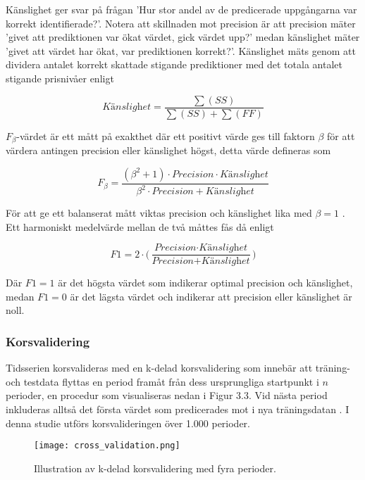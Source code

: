 \documentclass[11pt]{article}
\numberwithin{equation}{section}
\numberwithin{table}{section}
\numberwithin{figure}{section}
\begin{document}
Känslighet ger svar på frågan 'Hur stor andel av de predicerade uppgångarna var korrekt identifierade?'. Notera att skillnaden mot precision är att precision mäter 'givet att prediktionen var ökat värdet, gick värdet upp?' medan känslighet mäter 'givet att värdet har ökat, var prediktionen korrekt?'. Känslighet mäts genom att dividera antalet korrekt skattade stigande prediktioner med det totala antalet stigande prisnivåer enligt

\begin{equation}
    \textit{Känslighet} = \frac{\sum(SS)}{\sum(SS)+\sum(FF)}
\end{equation}

$F_{\beta}$-värdet är ett mått på exakthet där ett positivt värde ges till faktorn $\beta$ för att värdera antingen precision eller känslighet högst, detta värde defineras som

\begin{equation}
    F_{\beta} = \frac{(\beta^2+1) \cdot \textit{Precision} \cdot 
    \textit{Känslighet}}{\beta^2 \cdot \textit{Precision} + \textit{Känslighet}}
\end{equation}

För att ge ett balanserat mått viktas precision och känslighet lika med $\beta=1$ \parencite{ModelValidation}. Ett harmoniskt medelvärde mellan de två måttes fås då enligt

\begin{equation}
    \textit{F1} = 2 \cdot \Big( \frac{\textit{Precision} \cdot \textit{Känslighet}}{\textit{Precision} + \textit{Känslighet}} \Big)
\end{equation}

Där $F1=1$ är det högsta värdet som indikerar optimal precision och känslighet, medan $F1=0$ är det lägsta värdet och indikerar att precision eller känslighet är noll.


\subsubsection{Korsvalidering}
Tidsserien korsvalideras med en k-delad korsvalidering som innebär att träning- och testdata flyttas en period framåt från dess ursprungliga startpunkt i $n$ perioder, en procedur som visualiseras nedan i Figur 3.3. Vid nästa period inkluderas alltså det första värdet som predicerades mot i nya träningsdatan \parencite{bergmeir2018note}. I denna studie utförs korsvalideringen över 1.000 perioder. 

\begin{figure}[H]
\caption{Illustration av k-delad korsvalidering med fyra perioder.}
\texttt{[image: cross\_validation.png]}
\centering
\end{figure}
\end{document}
